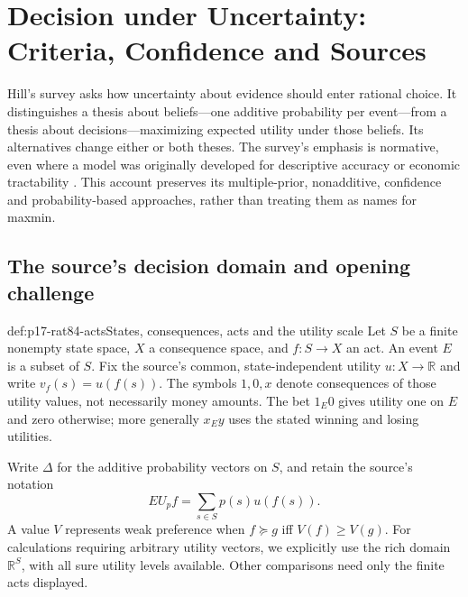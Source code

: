 \chapter{Decision under Uncertainty: Criteria, Confidence and Sources}
\label{sec:p17-rationality-8-4}

Hill's survey asks how uncertainty about evidence should enter rational
choice. It distinguishes a thesis about beliefs---one additive probability
per event---from a thesis about decisions---maximizing expected utility
under those beliefs. Its alternatives change either or both theses.
The survey's emphasis is normative, even where a model was originally
developed for descriptive accuracy or economic tractability
\cite[chapter~8.4, pp.~495--504]{Hill2021DecisionUncertainty}.
This account preserves its multiple-prior, nonadditive, confidence and
probability-based approaches, rather than treating them as names for maxmin.

\section{The source's decision domain and opening challenge}
\label{sec:p17-rat84-domain}

\begin{hbdefinition}{def:p17-rat84-acts}{States, consequences, acts and the utility scale}
Let \(S\) be a finite nonempty state space, \(X\) a consequence space,
and \(f:S\to X\) an act. An event \(E\) is a subset of \(S\).
Fix the source's common, state-independent utility \(u:X\to\mathbb R\)
and write \(v_f(s)=u(f(s))\). The symbols \(1,0,x\) denote
consequences of those utility values, not necessarily money amounts.
The bet \(1_E0\) gives utility one on \(E\) and zero otherwise;
more generally \(x_Ey\) uses the stated winning and losing utilities.

Write \(\Delta\) for the additive probability vectors on \(S\), and
retain the source's notation
\[
                  EU_p f=\sum_{s\in S}p(s)u(f(s)).
\]
A value \(V\) represents weak preference when
\(f\succeq g\) iff \(V(f)\geq V(g)\).
For calculations requiring arbitrary utility vectors, we explicitly use
the rich domain \(\mathbb R^S\), with all sure utility levels available.
Other comparisons need only the finite acts displayed.
\end{hbdefinition}


